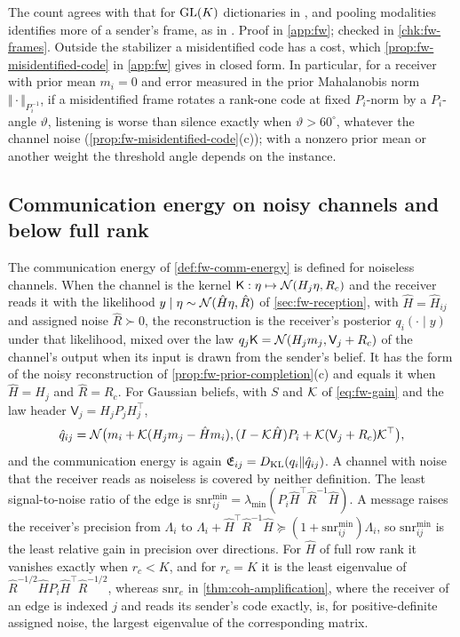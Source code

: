 The count agrees with that for $\mathrm{GL}(K)$ dictionaries in \citet{dennis2026communicating}, and pooling modalities identifies more of a sender's frame, as in \citet{dennis2026magent}. Proof in \cref{app:fw}; checked in \cref{chk:fw-frames}. Outside the stabilizer a misidentified code has a cost, which \cref{prop:fw-misidentified-code} in \cref{app:fw} gives in closed form. In particular, for a receiver with prior mean $m_i=0$ and error measured in the prior Mahalanobis norm $\Vert\cdot\Vert_{P_i^{-1}}$, if a misidentified frame rotates a rank-one code at fixed $P_i$-norm by a $P_i$-angle $\vartheta$, listening is worse than silence exactly when $\vartheta>60^\circ$, whatever the channel noise (\cref{prop:fw-misidentified-code}(c)); with a nonzero prior mean or another weight the threshold angle depends on the instance.

\subsection{Communication energy on noisy channels and below full rank}\label{sup:fw-comm-energy}

The communication energy of \cref{def:fw-comm-energy} is defined for noiseless channels. When the channel is the kernel $\mathsf K:\eta\mapsto\mathcal{N}(H_j\eta,R_c)$ and the receiver reads it with the likelihood $y\mid\eta\sim\mathcal{N}(\hat H\eta,\hat R)$ of \cref{sec:fw-reception}, with $\hat H=\hat H_{ij}$ and assigned noise $\hat R\succ0$, the reconstruction is the receiver's posterior $q_i(\cdot\mid y)$ under that likelihood, mixed over the law $q_j\mathsf K=\mathcal{N}(H_jm_j,\mathsf V_j+R_c)$ of the channel's output when its input is drawn from the sender's belief. It has the form of the noisy reconstruction of \cref{prop:fw-prior-completion}(c) and equals it when $\hat H=H_j$ and $\hat R=R_c$. For Gaussian beliefs, with $S$ and $\mathcal{K}$ of \eqref{eq:fw-gain} and the law header $\mathsf V_j=H_jP_jH_j^\top$,
\begin{equation}\label{eq:fw-noisy-reconstruction}
\hat q_{ij}=\mathcal{N}\bigl(m_i+\mathcal{K}(H_jm_j-\hat Hm_i),(I-\mathcal{K}\hat H)P_i+\mathcal{K}(\mathsf V_j+R_c)\mathcal{K}^\top\bigr),
\end{equation}
and the communication energy is again $\mathfrak E_{ij}=D_{\mathrm{KL}}(q_i\Vert\hat q_{ij})$. A channel with noise that the receiver reads as noiseless is covered by neither definition. The least signal-to-noise ratio of the edge is $\mathrm{snr}^{\min}_{ij}=\lambda_{\min}(P_i\hat H^\top\hat R^{-1}\hat H)$. A message raises the receiver's precision from $\Lambda_i$ to $\Lambda_i+\hat H^\top\hat R^{-1}\hat H\succeq(1+\mathrm{snr}^{\min}_{ij})\Lambda_i$, so $\mathrm{snr}^{\min}_{ij}$ is the least relative gain in precision over directions. For $\hat H$ of full row rank it vanishes exactly when $r_c<K$, and for $r_c=K$ it is the least eigenvalue of $\hat R^{-1/2}\hat HP_i\hat H^\top\hat R^{-1/2}$, whereas $\mathrm{snr}_e$ in \cref{thm:coh-amplification}, where the receiver of an edge is indexed $j$ and reads its sender's code exactly, is, for positive-definite assigned noise, the largest eigenvalue of the corresponding matrix.

